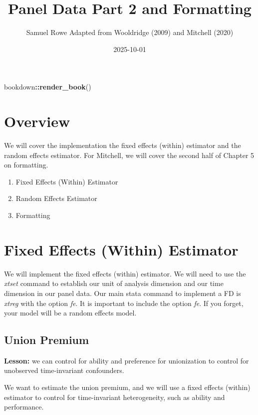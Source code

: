 \documentclass[
]{book}
\title{Panel Data Part 2 and Formatting}
\author{Samuel Rowe Adapted from Wooldridge (2009) and Mitchell (2020)}
\date{2025-10-01}
\newenvironment{Shaded}{\begin{snugshade}}{\end{snugshade}}
\newcommand{\FunctionTok}[1]{\textcolor[rgb]{0.13,0.29,0.53}{\textbf{#1}}}
\newcommand{\NormalTok}[1]{#1}
\newcommand{\SpecialCharTok}[1]{\textcolor[rgb]{0.81,0.36,0.00}{\textbf{#1}}}
\providecommand{\tightlist}{%
  \setlength{\itemsep}{0pt}\setlength{\parskip}{0pt}}
\begin{document}
\maketitle

{
\setcounter{tocdepth}{1}
\tableofcontents
}
\begin{Shaded}
\begin{Highlighting}[]
\NormalTok{bookdown}\SpecialCharTok{::}\FunctionTok{render\_book}\NormalTok{()}
\end{Highlighting}
\end{Shaded}

\chapter{Overview}\label{overview}

We will cover the implementation the fixed effects (within) estimator and the random effects estimator. For Mitchell, we will cover the second half of Chapter 5 on formatting.

\begin{enumerate}
\def\labelenumi{\arabic{enumi}.}
\tightlist
\item
  Fixed Effects (Within) Estimator
\item
  Random Effects Estimator
\item
  Formatting
\end{enumerate}

\chapter{Fixed Effects (Within) Estimator}\label{fixed-effects-within-estimator}

We will implement the fixed effects (within) estimator. We will need to use the \emph{xtset} command to establish our unit of analysis dimension and our time dimension in our panel data. Our main stata command to implement a FD is \emph{xtreg} with the option \emph{fe}. It is important to include the option \emph{fe}. If you forget, your model will be a random effects model.

\section{Union Premium}\label{union-premium}

\textbf{Lesson:} we can control for ability and preference for unionization to control for unobserved time-invariant confounders.

We want to estimate the union premium, and we will use a fixed effects (within) estimator to control for time-invariant heterogeneity, such as ability and performance.
\end{document}
